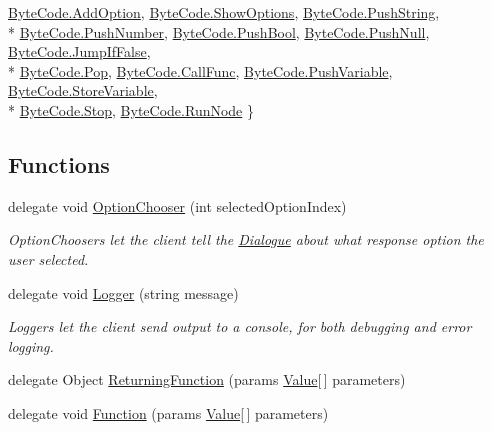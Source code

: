 \begin{DoxyCompactItemize}
\hyperlink{a00048_ad5dfb6ee68ca7469623ad3e459f98894a0e6a6b9eb32a4d55f277d45eff74250d}{Byte\-Code.\-Add\-Option}, 
\hyperlink{a00048_ad5dfb6ee68ca7469623ad3e459f98894a658963e1a47a5018fd1e6fbc2af804f7}{Byte\-Code.\-Show\-Options}, 
\hyperlink{a00048_ad5dfb6ee68ca7469623ad3e459f98894a3e7800d36ccb7bfe6c463bbe7db7e41a}{Byte\-Code.\-Push\-String}, 
\\*
\hyperlink{a00048_ad5dfb6ee68ca7469623ad3e459f98894a29c8f5d9d5088ada190ccd9c21c31f33}{Byte\-Code.\-Push\-Number}, 
\hyperlink{a00048_ad5dfb6ee68ca7469623ad3e459f98894af698d0b66ccf00f7d362c039949d1b80}{Byte\-Code.\-Push\-Bool}, 
\hyperlink{a00048_ad5dfb6ee68ca7469623ad3e459f98894acf728db6b8e47e735666156aec7ae755}{Byte\-Code.\-Push\-Null}, 
\hyperlink{a00048_ad5dfb6ee68ca7469623ad3e459f98894af8bbf32f00c942d974ade428e24b021f}{Byte\-Code.\-Jump\-If\-False}, 
\\*
\hyperlink{a00048_ad5dfb6ee68ca7469623ad3e459f98894a0ae61bd0474e04c9f1195d4baa0213a0}{Byte\-Code.\-Pop}, 
\hyperlink{a00048_ad5dfb6ee68ca7469623ad3e459f98894a3b5e7e8300dc6e4b78cb865c5b10f01a}{Byte\-Code.\-Call\-Func}, 
\hyperlink{a00048_ad5dfb6ee68ca7469623ad3e459f98894ab8c46f65015a178516fadbb5ad6c2038}{Byte\-Code.\-Push\-Variable}, 
\hyperlink{a00048_ad5dfb6ee68ca7469623ad3e459f98894a872dc050abaff4beb46e70dadd4088c2}{Byte\-Code.\-Store\-Variable}, 
\\*
\hyperlink{a00048_ad5dfb6ee68ca7469623ad3e459f98894a11a755d598c0c417f9a36758c3da7481}{Byte\-Code.\-Stop}, 
\hyperlink{a00048_ad5dfb6ee68ca7469623ad3e459f98894ae956bcf888278c168ee9b106927ff6ac}{Byte\-Code.\-Run\-Node}
 \}
\end{DoxyCompactItemize}
\subsection*{Functions}
\begin{DoxyCompactItemize}
\item 
delegate void \hyperlink{a00048_a39866cbb03c03a35805d598b5d4ad553}{Option\-Chooser} (int selected\-Option\-Index)
\begin{DoxyCompactList}\small\item\em Option\-Choosers let the client tell the \hyperlink{a00088}{Dialogue} about what response option the user selected. \end{DoxyCompactList}\item 
delegate void \hyperlink{a00048_a1e50031b945a3a2afafee6f590730568}{Logger} (string message)
\begin{DoxyCompactList}\small\item\em Loggers let the client send output to a console, for both debugging and error logging. \end{DoxyCompactList}\item 
delegate Object \hyperlink{a00048_a5177bf74fbfe7303fac9d8236c2e514b}{Returning\-Function} (params \hyperlink{a00165}{Value}\mbox{[}$\,$\mbox{]} parameters)
\item 
delegate void \hyperlink{a00048_ae0be2e5cf13d5779816102439e61ff1a}{Function} (params \hyperlink{a00165}{Value}\mbox{[}$\,$\mbox{]} parameters)
\end{DoxyCompactItemize}


